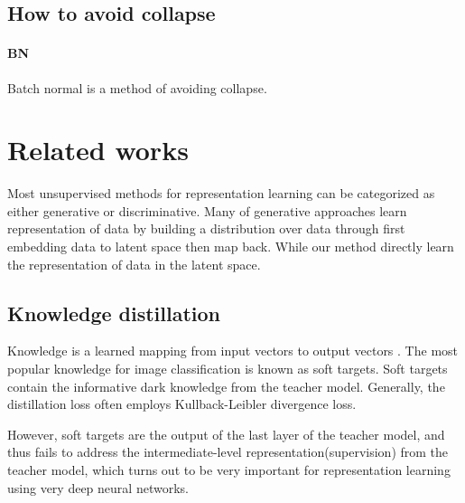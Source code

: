 \documentclass[a4paper]{article}
\begin{document}
	\subsection{How to avoid collapse}
	\label{subsec:avoid-collapse}

	\paragraph*{BN}
	Batch normal is a method of avoiding collapse.


	
	\section{Related works}
	\label{sec:related}
	
	Most unsupervised methods for representation learning can be categorized as either generative or discriminative.
	Many of generative approaches learn representation of data by building a distribution over data through first embedding data to latent space then map back.
	While our method directly learn the representation of data in the latent space.

	\subsection{Knowledge distillation}
	Knowledge is a learned mapping from input vectors to output vectors \cite{hinton2015distilling} .
	The most popular knowledge for image classification is known as soft targets. 
	Soft targets contain the informative dark knowledge from the teacher model.
	Generally, the distillation loss often employs Kullback-Leibler divergence loss.

	However, soft targets are the output of the last layer of the teacher model, and thus fails to address the intermediate-level representation(supervision) from the teacher model, which turns out to be very important for representation learning using very deep neural networks.
\end{document}
